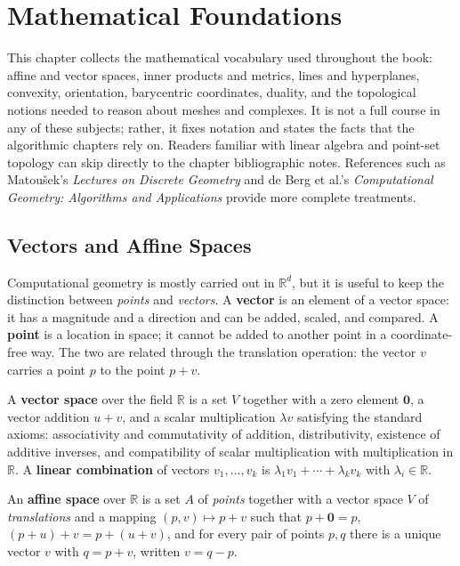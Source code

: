 \chapter{Mathematical Foundations}
\label{ch:math_foundations}

This chapter collects the mathematical vocabulary used throughout the book:
affine and vector spaces, inner products and metrics, lines and hyperplanes,
convexity, orientation, barycentric coordinates, duality, and the topological
notions needed to reason about meshes and complexes. It is not a full course
in any of these subjects; rather, it fixes notation and states the facts that
the algorithmic chapters rely on. Readers familiar with linear algebra and
point-set topology can skip directly to the chapter bibliographic notes.
References such as Matou\v{s}ek's \emph{Lectures on Discrete Geometry}
\cite{matousek1999} and de Berg et al.'s \emph{Computational Geometry:
Algorithms and Applications} \cite{deberg2008} provide more complete
treatments.

\section{Vectors and Affine Spaces}
\label{sec:math_vectors_affine}

Computational geometry is mostly carried out in $\mathbb{R}^d$, but it is
useful to keep the distinction between \emph{points} and \emph{vectors}.
A \textbf{vector} is an element of a vector space: it has a magnitude and a
direction and can be added, scaled, and compared. A \textbf{point} is a
location in space; it cannot be added to another point in a coordinate-free
way. The two are related through the translation operation: the vector $v$
carries a point $p$ to the point $p+v$.

\begin{definition}
  A \textbf{vector space} over the field $\mathbb{R}$ is a set $V$ together
  with a zero element $\mathbf{0}$, a vector addition $u+v$, and a scalar
  multiplication $\lambda v$ satisfying the standard axioms: associativity
  and commutativity of addition, distributivity, existence of additive
  inverses, and compatibility of scalar multiplication with multiplication in
  $\mathbb{R}$. A \textbf{linear combination} of vectors $v_1,\dots,v_k$ is
  $\lambda_1 v_1 + \cdots + \lambda_k v_k$ with $\lambda_i \in \mathbb{R}$.
\end{definition}

\begin{definition}
  An \textbf{affine space} over $\mathbb{R}$ is a set $A$ of \emph{points}
  together with a vector space $V$ of \emph{translations} and a mapping
  $(p,v) \mapsto p+v$ such that $p+\mathbf{0} = p$, $(p+u)+v = p+(u+v)$, and
  for every pair of points $p,q$ there is a unique vector $v$ with $q=p+v$,
  written $v = q - p$.
\end{definition}

